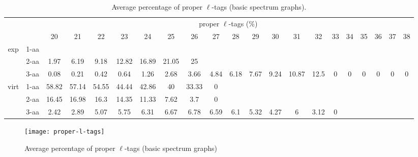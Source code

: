 \documentclass{article}[12pt]
\begin{document}
\begin{landscape}
\begin{table}[h]\tiny
\vspace{3mm}
{\centering
\begin{center}
\begin{tabular}{|c|l|c|c|c|c|c|c|c|c|c|c|c|c|c|c|c|c|c|c|c|}
  \hline
  \multicolumn{2}{|c|}{ } & \multicolumn{ 19 }{|c|}{ proper $\ell$-tags (\%)} \\
  \cline{3- 21}
  \multicolumn{2}{|c|}{ }  & 20 & 21 & 22 & 23 & 24 & 25 & 26 & 27 & 28 & 29 & 30 & 31 & 32 & 33 & 34 & 35 & 36 & 37 & 38\\
  \hline
  \multirow{3}{*}{exp}
&  1-aa  &  &  &  &  &  &  &  &  &  &  &  &  &  &  &  &  &  &  & \\
&  2-aa  & 1.97 & 6.19 & 9.18 & 12.82 & 16.89 & 21.05 & 25 &  &  &  &  &  &  &  &  &  &  &  & \\
&  3-aa  & 0.08 & 0.21 & 0.42 & 0.64 & 1.26 & 2.68 & 3.66 & 4.84 & 6.18 & 7.67 & 9.24 & 10.87 & 12.5 & 0 & 0 & 0 & 0 & 0 & 0\\
 \hline
  \multirow{3}{*}{virt} 
&  1-aa  & 58.82 & 57.14 & 54.55 & 44.44 & 42.86 & 40 & 33.33 & 0 &  &  &  &  &  &  &  &  &  &  & \\
&  2-aa  & 16.45 & 16.98 & 16.3 & 14.35 & 11.33 & 7.62 & 3.7 & 0 &  &  &  &  &  &  &  &  &  &  & \\
&  3-aa  & 2.42 & 2.89 & 5.07 & 5.75 & 6.31 & 6.67 & 6.78 & 6.59 & 6.1 & 5.32 & 4.27 & 6 & 3.12 & 0 &  &  &  &  & \\
 \hline
\end{tabular}
\end{center}
\par}
\centering
\caption{ Average percentage of proper $\ell$-tags (basic spectrum graphs).}
\label{table:proper-l-tags}
\vspace{3mm}
\end{table}

\end{landscape}

\begin{figure}
  \begin{center}
\texttt{[image: proper-l-tags]}
\end{center}
\caption{Average percentage of proper $\ell$-tags (basic spectrum graphs)}
  \label{fig:proper-l-tags}
\end{figure}
\end{document}
